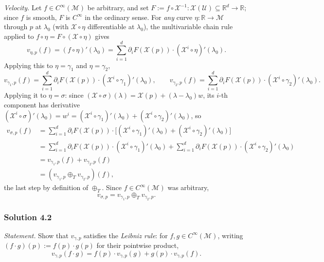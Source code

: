 \documentclass[11pt]{article}
\newcommand{\Cinf}{C^\infty(\mathcal M)}
\begin{document}
\emph{Velocity.} Let $f\in\Cinf$ be arbitrary, and set $F:=f\circ\mathcal
X^{-1}:\mathcal X(\mathcal U)\subseteq\mathbb R^d\to\mathbb R$; since $f$ is
smooth, $F$ is $C^\infty$ in the ordinary sense. For \emph{any} curve
$\eta:\mathbb R\to\mathcal M$ through $p$ at $\lambda_0$ (with $\mathcal
X\circ\eta$ differentiable at $\lambda_0$), the multivariable chain rule
applied to $f\circ\eta = F\circ(\mathcal X\circ\eta)$ gives
\[
v_{\eta,p}(f) = (f\circ\eta)'(\lambda_0) = \sum_{i=1}^d
\partial_iF(\mathcal X(p))\cdot(\mathcal X^i\circ\eta)'(\lambda_0).
\]
Applying this to $\eta=\gamma_1$ and $\eta=\gamma_2$,
\[
v_{\gamma_1,p}(f) = \sum_{i=1}^d\partial_iF(\mathcal X(p))\cdot(\mathcal
X^i\circ\gamma_1)'(\lambda_0), \qquad v_{\gamma_2,p}(f) = \sum_{i=1}^d
\partial_iF(\mathcal X(p))\cdot(\mathcal X^i\circ\gamma_2)'(\lambda_0).
\]
Applying it to $\eta=\sigma$: since $(\mathcal X\circ\sigma)(\lambda)=
\mathcal X(p)+(\lambda-\lambda_0)w$, its $i$-th component has derivative
$(\mathcal X^i\circ\sigma)'(\lambda_0)=w^i=(\mathcal X^i\circ\gamma_1)'
(\lambda_0)+(\mathcal X^i\circ\gamma_2)'(\lambda_0)$, so
\begin{align*}
v_{\sigma,p}(f)
&= \sum_{i=1}^d\partial_iF(\mathcal X(p))\cdot\Big[(\mathcal
X^i\circ\gamma_1)'(\lambda_0)+(\mathcal X^i\circ\gamma_2)'(\lambda_0)\Big]
\\
&= \sum_{i=1}^d\partial_iF(\mathcal X(p))\cdot(\mathcal
X^i\circ\gamma_1)'(\lambda_0) + \sum_{i=1}^d\partial_iF(\mathcal
X(p))\cdot(\mathcal X^i\circ\gamma_2)'(\lambda_0) \\
&= v_{\gamma_1,p}(f) + v_{\gamma_2,p}(f) \\
&= (v_{\gamma_1,p}\oplus_T v_{\gamma_2,p})(f),
\end{align*}
the last step by definition of $\oplus_T$. Since $f\in\Cinf$ was
arbitrary,
\[
v_{\sigma,p} = v_{\gamma_1,p}\oplus_T v_{\gamma_2,p}.
\]

\subsubsection*{Solution 4.2}

\noindent\textit{Statement.} Show that $v_{\gamma,p}$ satisfies the
\emph{Leibniz rule}: for $f,g\in\Cinf$, writing $(f\cdot g)(p):=f(p)\cdot
g(p)$ for their pointwise product,
\[
v_{\gamma,p}(f\cdot g) = f(p)\cdot v_{\gamma,p}(g) + g(p)\cdot
v_{\gamma,p}(f).
\]
\end{document}
